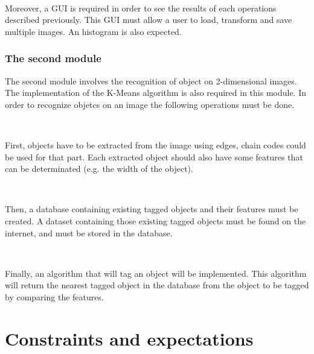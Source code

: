 ~~


Moreover, a \gls{GUI} is required in order to see the results of each operations described previously. This \gls{GUI} must allow a user to load, transform and save multiple images. An \gls{histogram} is also expected.


\subsubsection{The second module}

The second module involves the recognition of object on 2-dimensional images. The implementation of the K-Means \gls{algorithm} is also required in this module. In order to recognize objetcs on an image the following operations must be done. 

~~

First, objects have to be extracted from the image using edges, chain codes could be used for that part. Each extracted object should also have some features that can be determinated (e.g. the width of the object). 

~~

Then, a database containing existing tagged objects and their features must be created. A dataset containing those existing tagged objects must be found on the internet, and must be stored in the database. 

~~

Finally, an \gls{algorithm} that will tag an object will be implemented. This \gls{algorithm} will return the nearest tagged object in the database from the object to be tagged by comparing the features. 



 



\section{Constraints and expectations}




